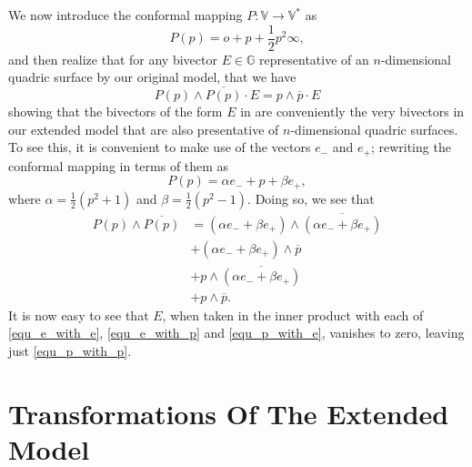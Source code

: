 \documentclass{birkjour}
\theoremstyle{definition}
\theoremstyle{remark}
\numberwithin{equation}{section}
\newcommand{\G}{\mathbb{G}}
\newcommand{\V}{\mathbb{V}}
\newcommand{\nvao}{o}
\newcommand{\nvai}{\infty}
\newcommand{\eminus}{e_{-}}
\newcommand{\eplus}{e_{+}}
\begin{document}
We now introduce the conformal mapping $P:\V\to\V^*$ as
\begin{equation}
P(p) = \nvao + p + \frac{1}{2}p^2\nvai,
\end{equation}
and then realize that for any bivector $E\in\G$ representative of an $n$-dimensional
quadric surface by our original model, that we have
\begin{equation}
P(p)\wedge\overline{P(p)}\cdot E = p\wedge\overline{p}\cdot E
\end{equation}
showing that the bivectors of the form $E$ in \cite{Parkin12} are 
conveniently the very bivectors in our extended model that are also presentative
of $n$-dimensional quadric surfaces.  To see this, it is convenient
to make use of the vectors $\eminus$ and $\eplus$; rewriting the conformal
mapping in terms of them as
\begin{equation}
P(p) = \alpha\eminus + p + \beta\eplus,
\end{equation}
where $\alpha=\frac{1}{2}(p^2+1)$ and $\beta=\frac{1}{2}(p^2-1)$.
Doing so, we see that
\begin{align}
P(p)\wedge\overline{P(p)}
 &= (\alpha\eminus + \beta\eplus)\wedge\overline{(\alpha\eminus + \beta\eplus)}\label{equ_e_with_e} \\
 &+  (\alpha\eminus + \beta\eplus)\wedge\overline{p}\label{equ_e_with_p} \\
 &+ p\wedge\overline{(\alpha\eminus + \beta\eplus)}\label{equ_p_with_e} \\
 &+ p\wedge\overline{p}.\label{equ_p_with_p}
\end{align}
It is now easy to see that $E$, when taken in the inner product with
each of \eqref{equ_e_with_e}, \eqref{equ_e_with_p} and \eqref{equ_p_with_e}, vanishes to zero,
leaving just \eqref{equ_p_with_p}.

\section{Transformations Of The Extended Model}
\end{document}
